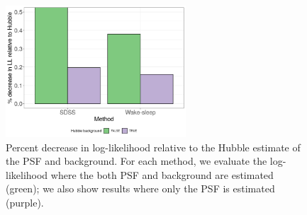 \begin{figure}[ht]
    \centering
    \includegraphics[width=0.6\textwidth]{figures/loglik_table.png}
    \caption{Percent decrease in log-likelihood relative to the Hubble estimate of the PSF and background. 
    For each method, we evaluate the log-likelihood where the both PSF 
    and background are estimated (green); 
    we also show results where only the PSF is estimated (purple). 
    }
    \label{fig:loglik_table}
\end{figure}

% 





